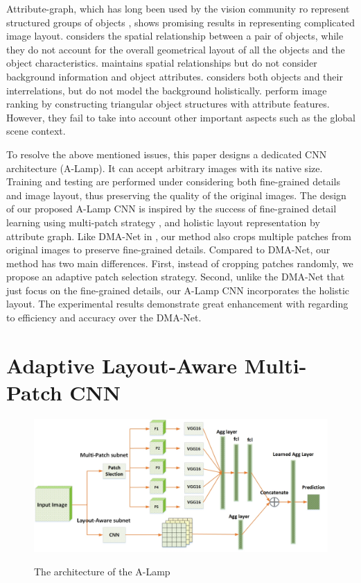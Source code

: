 \documentclass[10pt,twocolumn,letterpaper]{article}
\begin{document}
Attribute-graph, which has long been used by the vision community ro represent structured groups of objects \cite{Felzenszwalb:2004:graph_seg,Lu:2014:graph,CVPR:2014:multigraph,Shi:2000:PAMI:graph}, shows promising results in representing complicated image layout.  \cite{Lan:2012:ECCV:retrieval} considers the spatial relationship between a pair of objects, while they do not account for the overall geometrical layout of all the objects and the object characteristics. \cite{Xu:2010:SIGAPH:concep_map} maintains spatial relationships but do not consider background information and object attributes. \cite{2013:PAMI:description} considers both objects and their interrelations, but do not model the background holistically. \cite{Cao:2014:ACMMM:layout} perform image ranking by constructing triangular object structures with attribute features. However, they fail to take into account other important aspects such as the global scene context.

To resolve the above mentioned issues, this paper designs a dedicated CNN architecture (A-Lamp). It can accept arbitrary images with its native size. Training and testing are performed under considering both fine-grained details and image layout, thus preserving the quality of the original images. The design of our proposed A-Lamp CNN is inspired by the success of fine-grained detail learning using multi-patch strategy \cite{Lu:2015:ICCV,Liu:2016:CVPR:multi_patch}, and holistic layout representation by attribute graph. Like DMA-Net in \cite{Lu:2015:ICCV}, our method also crops multiple patches from original images to preserve fine-grained details. Compared to DMA-Net, our method has two main differences. First, instead of cropping patches randomly, we propose an adaptive patch selection strategy. Second, unlike the DMA-Net that just focus on the fine-grained details, our A-Lamp CNN incorporates the holistic layout. The experimental results demonstrate great enhancement with regarding to efficiency and accuracy over the DMA-Net.

\section{Adaptive Layout-Aware Multi-Patch CNN}
\begin{figure}
	\centering
	\includegraphics[scale=0.26]{figures/whole_net.jpg}
	\label{whole_net}
	\caption{The architecture of the A-Lamp}
\end{figure}
\end{document}
